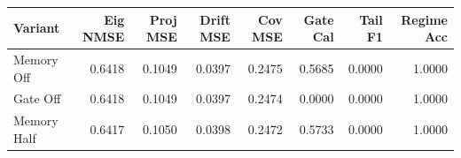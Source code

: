 \begin{tabular}{lrrrrrrr}
\toprule
Variant & Eig NMSE & Proj MSE & Drift MSE & Cov MSE & Gate Cal & Tail F1 & Regime Acc \\
\midrule
Memory Off & 0.6418 & 0.1049 & 0.0397 & 0.2475 & 0.5685 & 0.0000 & 1.0000 \\
Gate Off & 0.6418 & 0.1049 & 0.0397 & 0.2474 & 0.0000 & 0.0000 & 1.0000 \\
Memory Half & 0.6417 & 0.1050 & 0.0398 & 0.2472 & 0.5733 & 0.0000 & 1.0000 \\
\bottomrule
\end{tabular}